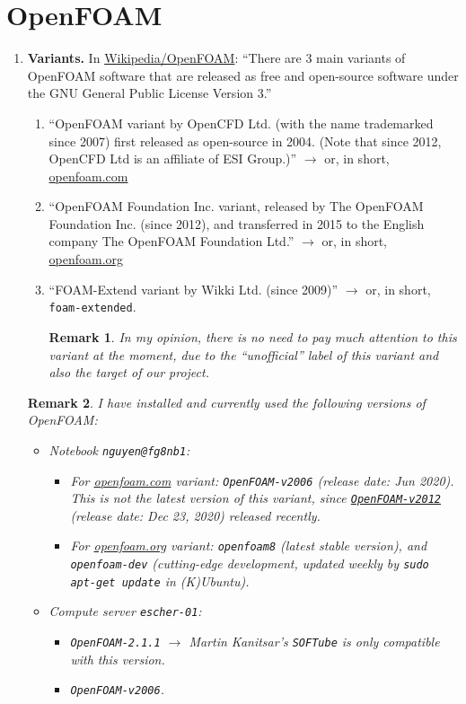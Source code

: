 \documentclass[onsided]{book}
\numberwithin{equation}{section}
\newtheorem{remark}{Remark}[section]
\begin{document}
\section{OpenFOAM}
\begin{enumerate}
    \item \textbf{Variants.} In \href{https://en.wikipedia.org/wiki/OpenFOAM}{Wikipedia/OpenFOAM}: ``There are 3 main variants of OpenFOAM software that are released as free and open-source software under the GNU General Public License Version 3.''
    \begin{enumerate}
        \item ``OpenFOAM variant by OpenCFD Ltd. (with the name trademarked since 2007) first released as open-source in 2004. (Note that since 2012, OpenCFD Ltd is an affiliate of ESI Group.)'' $\to$ or, in short, \href{https://www.openfoam.com/}{openfoam.com}
        \item ``OpenFOAM Foundation Inc. variant, released by The OpenFOAM Foundation Inc. (since 2012), and transferred in 2015 to the English company The OpenFOAM Foundation Ltd.'' $\to$ or, in short, \href{https://openfoam.org/}{openfoam.org}
        \item ``FOAM-Extend variant by Wikki Ltd. (since 2009)'' $\to$ or, in short, \texttt{foam-extended}.
        
        \begin{remark}
            In my opinion, there is no need to pay much attention to this variant at the moment, due to the ``unofficial'' label of this variant and also the target of our project.
        \end{remark}        
    \end{enumerate}

    \begin{remark}
        I have installed and currently used the following versions of OpenFOAM:
        \begin{itemize}
            \item Notebook \texttt{nguyen@fg8nb1}:
            \begin{itemize}
                \item For \href{https://www.openfoam.com/}{openfoam.com} variant: \texttt{OpenFOAM-v2006} (release date: Jun 2020). This is not the latest version of this variant, since \href{https://www.openfoam.com/releases/openfoam-v2012/}{\texttt{OpenFOAM-v2012}} (release date: Dec 23, 2020) released recently.
                \item For \href{https://openfoam.org/}{openfoam.org} variant: \texttt{openfoam8} (latest stable version), and \texttt{openfoam-dev} (cutting-edge development, updated weekly by \texttt{sudo apt-get update} in (K)Ubuntu).
            \end{itemize}
            \item Compute server \texttt{escher-01}:
            \begin{itemize}
                \item \texttt{OpenFOAM-2.1.1} $\to$ Martin Kanitsar's \texttt{SOFTube} is only compatible with this version.
                \item \texttt{OpenFOAM-v2006}.
                

\end{itemize}
\end{itemize}
\end{remark}
\end{enumerate}
\end{document}
